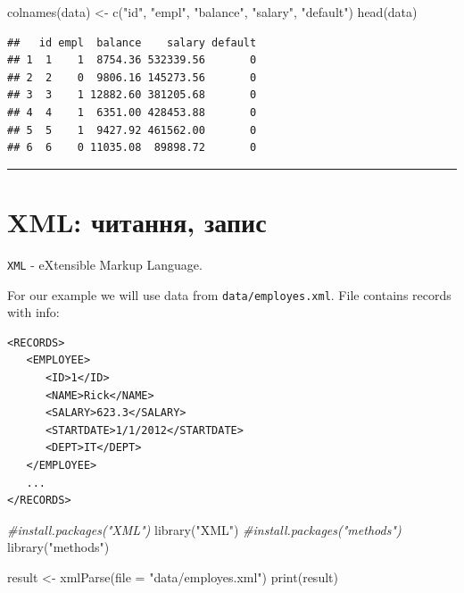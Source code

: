 \documentclass[
]{book}
\newenvironment{Shaded}{\begin{snugshade}}{\end{snugshade}}
\newcommand{\AttributeTok}[1]{\textcolor[rgb]{0.77,0.63,0.00}{#1}}
\newcommand{\CommentTok}[1]{\textcolor[rgb]{0.56,0.35,0.01}{\textit{#1}}}
\newcommand{\FunctionTok}[1]{\textcolor[rgb]{0.00,0.00,0.00}{#1}}
\newcommand{\NormalTok}[1]{#1}
\newcommand{\OtherTok}[1]{\textcolor[rgb]{0.56,0.35,0.01}{#1}}
\newcommand{\StringTok}[1]{\textcolor[rgb]{0.31,0.60,0.02}{#1}}
\begin{document}
\begin{Shaded}
\begin{Highlighting}[]
\FunctionTok{colnames}\NormalTok{(data) }\OtherTok{\textless{}{-}} \FunctionTok{c}\NormalTok{(}\StringTok{"id"}\NormalTok{, }\StringTok{"empl"}\NormalTok{, }\StringTok{"balance"}\NormalTok{, }\StringTok{"salary"}\NormalTok{, }\StringTok{"default"}\NormalTok{)}
\FunctionTok{head}\NormalTok{(data)}
\end{Highlighting}
\end{Shaded}

\begin{verbatim}
##   id empl  balance    salary default
## 1  1    1  8754.36 532339.56       0
## 2  2    0  9806.16 145273.56       0
## 3  3    1 12882.60 381205.68       0
## 4  4    1  6351.00 428453.88       0
## 5  5    1  9427.92 461562.00       0
## 6  6    0 11035.08  89898.72       0
\end{verbatim}

\begin{center}\rule{0.5\linewidth}{0.5pt}\end{center}

\hypertarget{chapter45}{%
\section{XML: читання, запис}\label{chapter45}}

\texttt{XML} - eXtensible Markup Language.

For our example we will use data from \texttt{data/employes.xml}. File contains records with info:

\begin{verbatim}
<RECORDS>
   <EMPLOYEE>
      <ID>1</ID>
      <NAME>Rick</NAME>
      <SALARY>623.3</SALARY>
      <STARTDATE>1/1/2012</STARTDATE>
      <DEPT>IT</DEPT>
   </EMPLOYEE>
   ...
</RECORDS>
\end{verbatim}

\begin{Shaded}
\begin{Highlighting}[]
\CommentTok{\#install.packages("XML")}
\FunctionTok{library}\NormalTok{(}\StringTok{"XML"}\NormalTok{)}
\CommentTok{\#install.packages("methods")}
\FunctionTok{library}\NormalTok{(}\StringTok{"methods"}\NormalTok{)}
\end{Highlighting}
\end{Shaded}

\begin{Shaded}
\begin{Highlighting}[]
\NormalTok{result }\OtherTok{\textless{}{-}} \FunctionTok{xmlParse}\NormalTok{(}\AttributeTok{file =} \StringTok{"data/employes.xml"}\NormalTok{)}
\FunctionTok{print}\NormalTok{(result)}
\end{Highlighting}
\end{Shaded}
\end{document}
